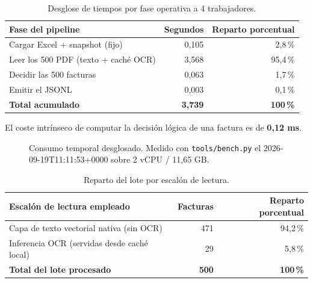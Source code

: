 \documentclass[11pt,a4paper]{article}
\begin{document}
\begin{table}[htbp]
\centering
\begin{tabular}{lrr}
\toprule
\textbf{Fase del pipeline} & \textbf{Segundos} & \textbf{Reparto porcentual} \\
\midrule
Cargar Excel + snapshot (fijo) & 0,105 & 2,8\,\% \\
Leer los 500 PDF (texto + caché OCR) & 3,568 & 95,4\,\% \\
Decidir las 500 facturas & 0,063 & 1,7\,\% \\
Emitir el JSONL & 0,003 & 0,1\,\% \\
\midrule
\textbf{Total acumulado} & \textbf{3,739} & \textbf{100\,\%} \\
\bottomrule
\end{tabular}
\caption{Desglose de tiempos por fase operativa a 4 trabajadores.}
\end{table}

El coste intrínseco de computar la decisión lógica de una factura es de \textbf{0,12 ms}.

\begin{figure}[htbp]
\centering
{}
\caption{Consumo temporal desglosado. Medido con \texttt{tools/bench.py} el 2026-09-19T11:11:53+0000 sobre 2 vCPU / 11,65 GB.}
\end{figure}

\begin{table}[htbp]
\centering
\begin{tabular}{lrr}
\toprule
\textbf{Escalón de lectura empleado} & \textbf{Facturas} & \textbf{Reparto porcentual} \\
\midrule
Capa de texto vectorial nativa (sin OCR) & 471 & 94,2\,\% \\
Inferencia OCR (servidas desde caché local) & 29 & 5,8\,\% \\
\midrule
\textbf{Total del lote procesado} & \textbf{500} & \textbf{100\,\%} \\
\bottomrule
\end{tabular}
\caption{Reparto del lote por escalón de lectura.}
\end{table}
\end{document}
